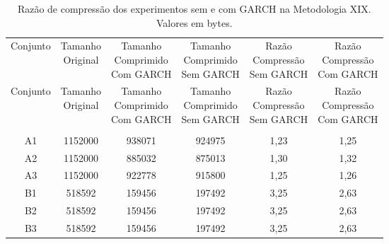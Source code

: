 \begin{center}
\begin{longtable}{cccccc}
\toprule
\rowcolor{white}
\caption[Metodologia XIX: Razão de compressão]{Razão de compressão dos
experimentos sem e com GARCH na Metodologia XIX.
Valores em bytes.} \label{Tab:razaocompressaoMet} \\
\midrule
Conjunto & \specialcell{Tamanho \\Original} & \specialcell{Tamanho
\\Comprimido\\Com GARCH} & \specialcell{Tamanho
\\Comprimido\\Sem GARCH} & \specialcell{Razão \\Compressão
\\Sem GARCH} & \specialcell{Razão \\Compressão
\\Com GARCH} \\
\midrule
\endfirsthead
\midrule
\rowcolor{white}
Conjunto & \specialcell{Tamanho \\Original} & \specialcell{Tamanho
\\Comprimido\\Com GARCH} & \specialcell{Tamanho
\\Comprimido\\Sem GARCH} & \specialcell{Razão \\Compressão
\\Sem GARCH} & \specialcell{Razão \\Compressão
\\Com GARCH} \\
\toprule
\endhead
\midrule \\ %
\endfoot
\bottomrule
\endlastfoot
    A1    & 1152000 & 938071 & 924975 & 1,23  & 1,25 \\
    A2    & 1152000 & 885032 & 875013 & 1,30  & 1,32 \\
    A3    & 1152000 & 922778 & 915800 & 1,25  & 1,26 \\
    B1    & 518592 & 159456 & 197492 & 3,25  & 2,63 \\
    B2    & 518592 & 159456 & 197492 & 3,25  & 2,63 \\
    B3    & 518592 & 159456 & 197492 & 3,25  & 2,63 \\

\end{longtable}
\end{center}
